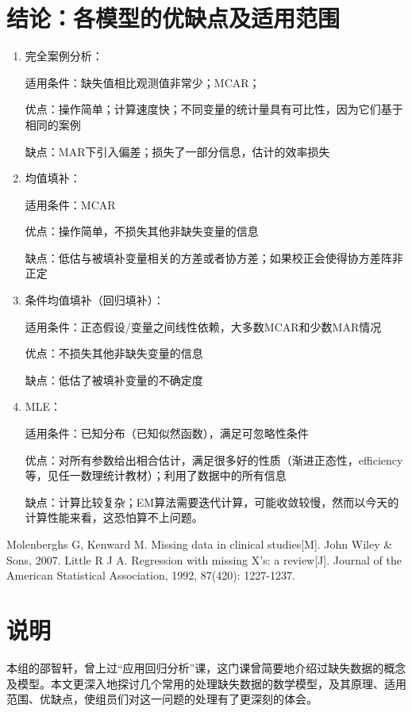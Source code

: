 \documentclass[aps,pre,12pt,preprint,onecolumn,showpacs,showkeys,AutoFakeBold]{revtex4-1}
\begin{document}
\section{结论：各模型的优缺点及适用范围}
    \begin{enumerate}
        \item 完全案例分析：

        适用条件：缺失值相比观测值非常少；MCAR；

        优点：操作简单；计算速度快；不同变量的统计量具有可比性，因为它们基于相同的案例

        缺点：MAR下引入偏差；损失了一部分信息，估计的效率损失

        \item 均值填补：

        适用条件：MCAR

        优点：操作简单，不损失其他非缺失变量的信息

        缺点：低估与被填补变量相关的方差或者协方差；如果校正会使得协方差阵非正定

        \item 条件均值填补（回归填补）：

        适用条件：正态假设/变量之间线性依赖，大多数MCAR和少数MAR情况

        优点：不损失其他非缺失变量的信息

        缺点：低估了被填补变量的不确定度

        \item MLE：

        适用条件：已知分布（已知似然函数），满足可忽略性条件

        优点：对所有参数给出相合估计，满足很多好的性质（渐进正态性，efficiency等，见任一数理统计教材）；利用了数据中的所有信息

        缺点：计算比较复杂；EM算法需要迭代计算，可能收敛较慢，然而以今天的计算性能来看，这恐怕算不上问题。
    \end{enumerate}

\begin{thebibliography}{}
     Molenberghs G, Kenward M. Missing data in clinical studies[M]. John Wiley \& Sons, 2007.
     Little R J A. Regression with missing X's: a review[J]. Journal of the American Statistical Association, 1992, 87(420): 1227-1237.
\end{thebibliography}
\appendix
\section{说明}
本组的邵智轩，曾上过“应用回归分析”课，这门课曾简要地介绍过缺失数据的概念及模型。本文更深入地探讨几个常用的处理缺失数据的数学模型，及其原理、适用范围、优缺点，使组员们对这一问题的处理有了更深刻的体会。
\end{document}
